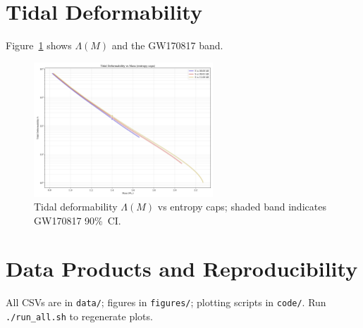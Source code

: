 \documentclass[11pt]{article}
\begin{document}
\section{Tidal Deformability}
Figure~\ref{fig:lambda} shows $\Lambda(M)$ and the GW170817 band.
\begin{figure}[h!]
\centering
\includegraphics[width=0.6\textwidth]{../figures/appendix_fig_a1.png}
\caption{Tidal deformability $\Lambda(M)$ vs entropy caps; shaded band indicates GW170817 90\%~CI.}
\label{fig:lambda}
\end{figure}

\section{Data Products and Reproducibility}
All CSVs are in \texttt{data/}; figures in \texttt{figures/}; plotting scripts in \texttt{code/}. Run \texttt{./run\_all.sh} to regenerate plots.



\end{document}
